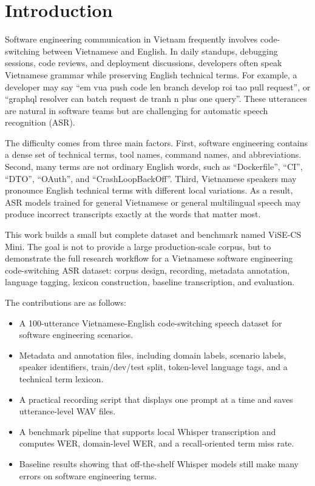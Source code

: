 \documentclass[conference]{IEEEtran}
\begin{document}
\section{Introduction}
Software engineering communication in Vietnam frequently involves code-switching between Vietnamese and English. In daily standups, debugging sessions, code reviews, and deployment discussions, developers often speak Vietnamese grammar while preserving English technical terms. For example, a developer may say ``em vua push code len branch develop roi tao pull request'', or ``graphql resolver can batch request de tranh n plus one query''. These utterances are natural in software teams but are challenging for automatic speech recognition (ASR).

The difficulty comes from three main factors. First, software engineering contains a dense set of technical terms, tool names, command names, and abbreviations. Second, many terms are not ordinary English words, such as ``Dockerfile'', ``CI'', ``DTO'', ``OAuth'', and ``CrashLoopBackOff''. Third, Vietnamese speakers may pronounce English technical terms with different local variations. As a result, ASR models trained for general Vietnamese or general multilingual speech may produce incorrect transcripts exactly at the words that matter most.

This work builds a small but complete dataset and benchmark named ViSE-CS Mini. The goal is not to provide a large production-scale corpus, but to demonstrate the full research workflow for a Vietnamese software engineering code-switching ASR dataset: corpus design, recording, metadata annotation, language tagging, lexicon construction, baseline transcription, and evaluation.

The contributions are as follows:
\begin{itemize}
\item A 100-utterance Vietnamese-English code-switching speech dataset for software engineering scenarios.
\item Metadata and annotation files, including domain labels, scenario labels, speaker identifiers, train/dev/test split, token-level language tags, and a technical term lexicon.
\item A practical recording script that displays one prompt at a time and saves utterance-level WAV files.
\item A benchmark pipeline that supports local Whisper transcription and computes WER, domain-level WER, and a recall-oriented term miss rate.
\item Baseline results showing that off-the-shelf Whisper models still make many errors on software engineering terms.
\end{itemize}
\end{document}
